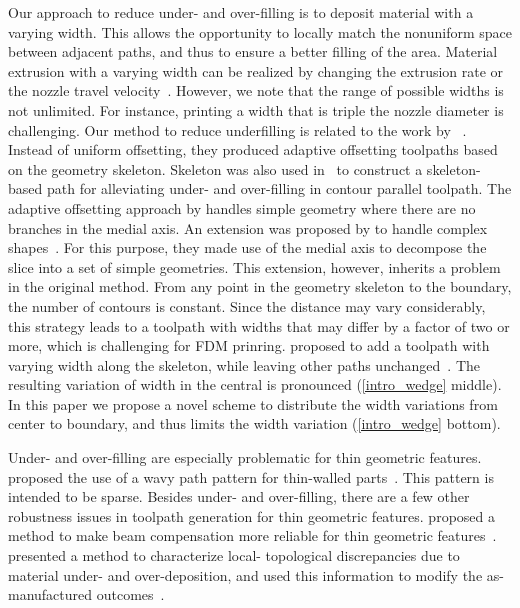 Our approach to reduce under- and over-filling is to deposit material with a varying width.
This allows the opportunity to locally match the nonuniform space between adjacent paths, and thus to ensure a better filling of the area.
Material extrusion with a varying width can be realized by changing the extrusion rate or the nozzle travel velocity~\cite{Ertay2018,Kuipers2018}.
However, we note that the range of possible widths is not unlimited.
For instance, printing a width that is triple the nozzle diameter is challenging.
Our method to reduce underfilling is related to the work by \citeauthor{kao1998optimal}~\cite{kao1998optimal}.
Instead of uniform offsetting, they produced adaptive offsetting toolpaths based on the geometry skeleton. 
Skeleton was also used in~\cite{Jin2017RCIM} to construct a skeleton-based path for alleviating under- and over-filling in contour parallel toolpath. 
The adaptive offsetting approach by \citeauthor{kao1998optimal} handles simple geometry where there are no branches in the medial axis.
An extension was proposed by \citeauthor{Ding2016a} to handle complex shapes~\cite{Ding2016a}.
For this purpose, they made use of the medial axis to decompose the slice into a set of simple geometries.
This extension, however, inherits a problem in the original method.
From any point in the geometry skeleton to the boundary, the number of contours is constant.
Since the distance may vary considerably, this strategy leads to a toolpath with widths that may differ by a factor of two or more, which is challenging for FDM prinring.
\citeauthor{Jin2017JMS} proposed to add a toolpath with varying width along the skeleton, while leaving other paths unchanged~\cite{Jin2017JMS}.
The resulting variation of width in the central is pronounced (\cref{intro_wedge} middle).
In this paper we propose a novel scheme to distribute the width variations from center to boundary, and thus limits the width variation (\cref{intro_wedge} bottom).

Under- and over-filling are especially problematic for thin geometric features.
\citeauthor{Jin2017a} proposed the use of a wavy path pattern for thin-walled parts~\cite{Jin2017a}.
This pattern is intended to be sparse. 
Besides under- and over-filling, there are a few other robustness issues in toolpath generation for thin geometric features.
\citeauthor{Moesen2011} proposed a method to make beam compensation more reliable for thin geometric features~\cite{Moesen2011}.
\citeauthor{Behandish2019a} presented a method to characterize local- topological discrepancies due to material under- and over-deposition, and used this information to modify the as-manufactured outcomes~\cite{Behandish2019a}. 



